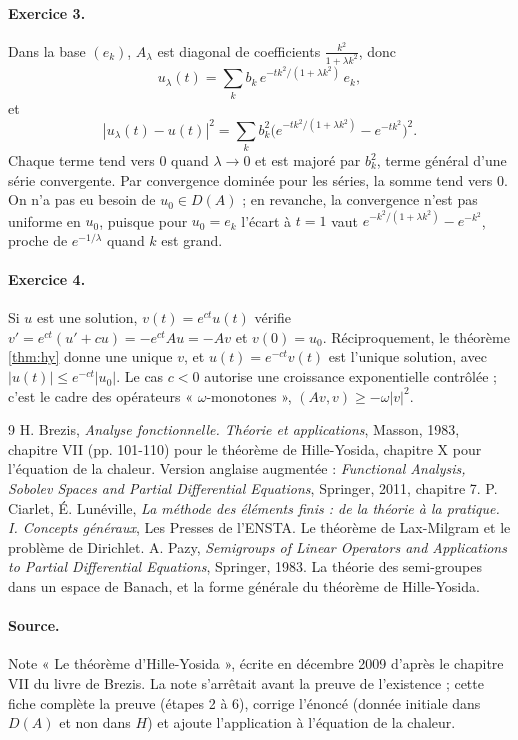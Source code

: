 \documentclass[11pt,a4paper]{article}
\theoremstyle{plain}
\theoremstyle{definition}
\theoremstyle{remark}
\begin{document}
\paragraph{Exercice 3.} Dans la base $(e_k)$, $A_\lambda$ est diagonal de coefficients $\frac{k^2}{1+\lambda k^2}$, donc
\[
  u_\lambda(t)=\sum_kb_k\,e^{-tk^2/(1+\lambda k^2)}\,e_k ,
\]
et
\[
  |u_\lambda(t)-u(t)|^2=\sum_kb_k^2\Big(e^{-tk^2/(1+\lambda k^2)}-e^{-tk^2}\Big)^2 .
\]
Chaque terme tend vers $0$ quand $\lambda\to0$ et est majoré par $b_k^2$, terme général d'une série convergente. Par convergence dominée pour les séries, la somme tend vers $0$. On n'a pas eu besoin de $u_0\in D(A)$ ; en revanche, la convergence n'est pas uniforme en $u_0$, puisque pour $u_0=e_k$ l'écart à $t=1$ vaut $e^{-k^2/(1+\lambda k^2)}-e^{-k^2}$, proche de $e^{-1/\lambda}$ quand $k$ est grand.

\paragraph{Exercice 4.} Si $u$ est une solution, $v(t)=e^{ct}u(t)$ vérifie $v'=e^{ct}(u'+cu)=-e^{ct}Au=-Av$ et $v(0)=u_0$. Réciproquement, le théorème \ref{thm:hy} donne une unique $v$, et $u(t)=e^{-ct}v(t)$ est l'unique solution, avec $|u(t)|\leq e^{-ct}|u_0|$. Le cas $c<0$ autorise une croissance exponentielle contrôlée ; c'est le cadre des opérateurs « $\omega$-monotones », $(Av,v)\geq-\omega|v|^2$.

\begin{thebibliography}{9}
 H. Brezis, \emph{Analyse fonctionnelle. Théorie et applications}, Masson, 1983, chapitre VII (pp. 101-110) pour le théorème de Hille-Yosida, chapitre X pour l'équation de la chaleur. Version anglaise augmentée : \emph{Functional Analysis, Sobolev Spaces and Partial Differential Equations}, Springer, 2011, chapitre 7.
 P. Ciarlet, É. Lunéville, \emph{La méthode des éléments finis : de la théorie à la pratique. I. Concepts généraux}, Les Presses de l'ENSTA. Le théorème de Lax-Milgram et le problème de Dirichlet.
 A. Pazy, \emph{Semigroups of Linear Operators and Applications to Partial Differential Equations}, Springer, 1983. La théorie des semi-groupes dans un espace de Banach, et la forme générale du théorème de Hille-Yosida.
\end{thebibliography}

\paragraph{Source.} Note « Le théorème d'Hille-Yosida », écrite en décembre 2009 d'après le chapitre VII du livre de Brezis. La note s'arrêtait avant la preuve de l'existence ; cette fiche complète la preuve (étapes 2 à 6), corrige l'énoncé (donnée initiale dans $D(A)$ et non dans $H$) et ajoute l'application à l'équation de la chaleur.
\end{document}
